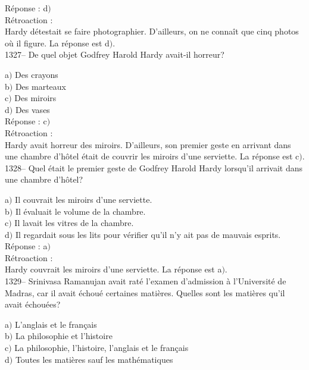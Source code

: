 ﻿\documentclass[letterpaper, 12pt]{article}
\begin{document}
R\'eponse : d$)$\\

R\'etroaction : \\
Hardy d\'etestait se faire photographier. D'ailleurs, on ne
conna\^it que cinq photos o\`u il figure.
La r\'eponse est  d$)$.\\

1327-- De quel objet Godfrey Harold Hardy avait-il horreur?

a$)$ Des crayons \\
b$)$ Des marteaux \\
c$)$ Des miroirs \\
d$)$ Des vases\\

R\'eponse : c$)$\\

R\'etroaction : \\
Hardy avait horreur des miroirs. D'ailleurs, son premier geste en
arrivant dans une chambre d'h\^otel \'etait de couvrir les miroirs
d'une serviette.
La r\'eponse est  c$)$.\\

1328-- Quel \'etait le premier geste de Godfrey Harold Hardy
lorsqu'il arrivait dans une chambre d'h\^otel?

a$)$ Il couvrait les miroirs d'une serviette. \\
b$)$ Il \'evaluait le volume de la chambre. \\
c$)$ Il lavait les vitres de la chambre. \\
d$)$ Il regardait sous les lits pour v\'erifier qu'il n'y ait pas de mauvais
esprits.\\

R\'eponse : a$)$\\

R\'etroaction : \\
Hardy couvrait les miroirs d'une serviette.
La r\'eponse est  a$)$.\\

1329-- Srinivasa Ramanujan avait rat\'e l'examen d'admission \`a
l'Universit\'e de Madras, car il avait \'echou\'e certaines
mati\`eres. Quelles sont les mati\`eres qu'il avait \'echou\'ees?

a$)$ L'anglais et le fran\c cais \\
b$)$ La philosophie et l'histoire \\
c$)$ La philosophie, l'histoire, l'anglais et le fran\c cais \\
d$)$ Toutes les mati\`eres sauf les math\'ematiques\\
\end{document}
